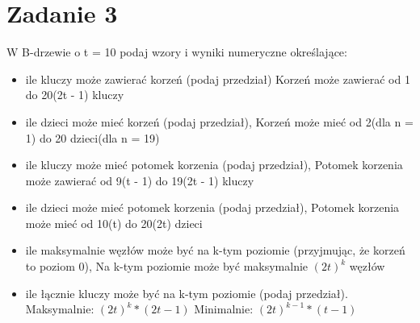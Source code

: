 \documentclass{article}
\begin{document}
    \section*{Zadanie 3}
    W B-drzewie o t = 10 podaj wzory i wyniki numeryczne określające:
    \begin{itemize} 
        \item ile kluczy może zawierać korzeń (podaj przedział)
        Korzeń może zawierać od 1 do 20(2t - 1) kluczy
        \item ile dzieci może mieć korzeń (podaj przedział),
        Korzeń może mieć od 2(dla n = 1) do 20 dzieci(dla n = 19) 
        \item ile kluczy może mieć potomek korzenia (podaj przedział),
        Potomek korzenia może zawierać od 9(t - 1) do 19(2t - 1) kluczy
        \item ile dzieci może mieć potomek korzenia (podaj przedział),
        Potomek korzenia może mieć od 10(t) do 20(2t) dzieci
        \item ile maksymalnie węzłów może być na k-tym poziomie (przyjmując,
        że korzeń to poziom 0),
        Na k-tym poziomie może być maksymalnie $(2t)^k$ węzłów
        \item ile łącznie kluczy może być na k-tym poziomie (podaj przedział).
        Maksymalnie: $(2t)^k * (2t - 1)$
        Minimalnie: $(2t)^{k - 1} * (t - 1)$
    \end{itemize}
    
\end{document}
